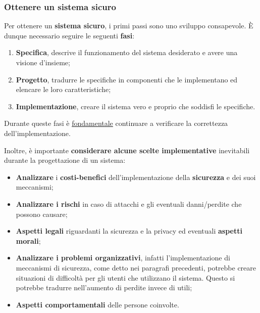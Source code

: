 \documentclass[a4paper]{article}
\begin{document}
	\subsubsection{Ottenere un sistema sicuro}
	
	Per ottenere un \textcolor{Red3}{\textbf{sistema sicuro}}, i primi passi sono uno sviluppo consapevole. È dunque necessario seguire le seguenti \textbf{fasi}:
	\begin{enumerate}
		\item \textbf{Specifica}, descrive il funzionamento del sistema desiderato e avere una visione d'insieme;
		\item \textbf{Progetto}, tradurre le specifiche in componenti che le implementano ed elencare le loro caratteristiche;
		\item \textbf{Implementazione}, creare il sistema vero e proprio che soddisfi le specifiche.
	\end{enumerate}
	Durante queste fasi è \underline{fondamentale} continuare a verificare la correttezza dell'implementazione.\newline
	
	\noindent
	Inoltre, è importante \textbf{considerare alcune scelte implementative} inevitabili durante la progettazione di un sistema:
	\begin{itemize}
		\item \textbf{Analizzare} i \textbf{costi-benefici} dell'implementazione della \textbf{sicurezza} e dei suoi meccanismi;
		
		\item \textbf{Analizzare i rischi} in caso di attacchi e gli eventuali danni/perdite che possono causare;
		
		\item \textbf{Aspetti legali} riguardanti la sicurezza e la privacy ed eventuali \textbf{aspetti morali};
		
		\item \textbf{Analizzare i problemi organizzativi}, infatti l'implementazione di meccanismi di sicurezza, come detto nei paragrafi precedenti, potrebbe creare situazioni di difficoltà per gli utenti che utilizzano il sistema. Questo si potrebbe tradurre nell'aumento di perdite invece di utili;
		
		\item \textbf{Aspetti comportamentali} delle persone coinvolte.
	\end{itemize}
	
	\newpage
\end{document}
